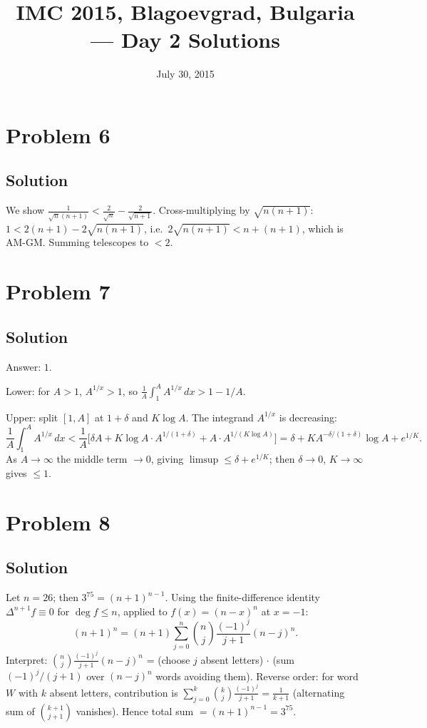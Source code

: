 \documentclass{article}
\title{IMC 2015, Blagoevgrad, Bulgaria --- Day 2 Solutions}
\date{July 30, 2015}
\begin{document}
\maketitle

\section*{Problem 6}
\subsection*{Solution}
We show $\frac{1}{\sqrt{n}(n+1)} < \frac{2}{\sqrt{n}} - \frac{2}{\sqrt{n+1}}$. Cross-multiplying by $\sqrt{n(n+1)}$: $1 < 2(n+1) - 2\sqrt{n(n+1)}$, i.e.\ $2\sqrt{n(n+1)} < n + (n+1)$, which is AM-GM. Summing telescopes to $< 2$.

\section*{Problem 7}
\subsection*{Solution}
Answer: $1$.

Lower: for $A > 1$, $A^{1/x} > 1$, so $\frac{1}{A}\int_1^A A^{1/x}\,dx > 1 - 1/A$.

Upper: split $[1, A]$ at $1+\delta$ and $K \log A$. The integrand $A^{1/x}$ is decreasing:
\[ \frac{1}{A}\int_1^A A^{1/x}\,dx < \frac{1}{A}\Big[\delta A + K\log A \cdot A^{1/(1+\delta)} + A \cdot A^{1/(K \log A)}\Big] = \delta + K A^{-\delta/(1+\delta)} \log A + e^{1/K}. \]
As $A \to \infty$ the middle term $\to 0$, giving $\limsup \le \delta + e^{1/K}$; then $\delta \to 0$, $K \to \infty$ gives $\le 1$.

\section*{Problem 8}
\subsection*{Solution}
Let $n = 26$; then $3^{75} = (n+1)^{n-1}$. Using the finite-difference identity $\Delta^{n+1} f \equiv 0$ for $\deg f \le n$, applied to $f(x) = (n-x)^n$ at $x = -1$:
\[ (n+1)^n = (n+1)\sum_{j=0}^n \binom{n}{j}\frac{(-1)^j}{j+1}(n-j)^n. \]
Interpret: $\binom{n}{j}\frac{(-1)^j}{j+1}(n-j)^n$ = (choose $j$ absent letters) $\cdot$ (sum $(-1)^j/(j+1)$ over $(n-j)^n$ words avoiding them). Reverse order: for word $W$ with $k$ absent letters, contribution is $\sum_{j=0}^k \binom{k}{j}\frac{(-1)^j}{j+1} = \frac{1}{k+1}$ (alternating sum of $\binom{k+1}{j+1}$ vanishes). Hence total sum $= (n+1)^{n-1} = 3^{75}$.
\end{document}
